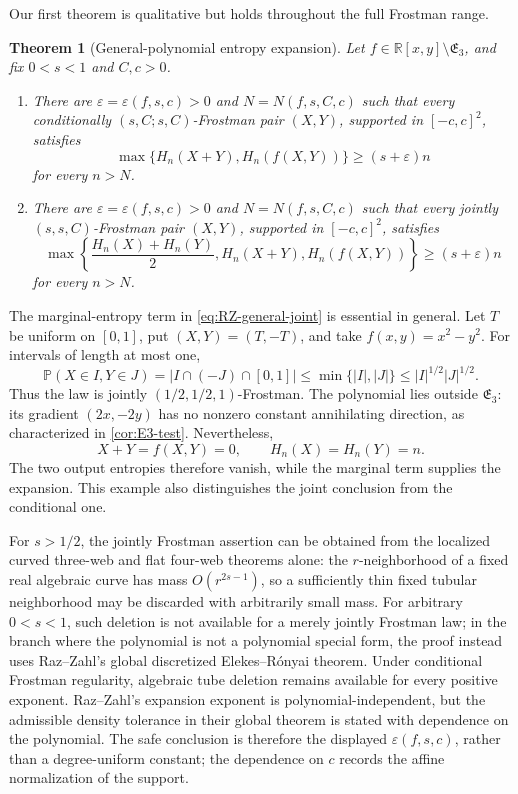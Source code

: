 \documentclass[11pt]{article}
\newtheorem{theorem}{Theorem}[section]
\begin{document}
Our first theorem is qualitative but holds throughout the full
Frostman range.

\begin{theorem}[General-polynomial entropy expansion]
\label{thm:RZ-general}
Let \(f\in\mathbb R[x,y]\setminus\mathfrak E_3\), and fix
\(0<s<1\) and \(C,c>0\).
\begin{enumerate}[label=\textup{(\roman*)}]
\item There are \(\varepsilon=\varepsilon(f,s,c)>0\) and
\(N=N(f,s,C,c)\) such that every conditionally
\((s,C;s,C)\)-Frostman pair \((X,Y)\), supported in
\([-c,c]^2\), satisfies
\begin{equation}
 \max\{H_n(X+Y),H_n(f(X,Y))\}\ge(s+\varepsilon)n
 \label{eq:RZ-general-cond}
\end{equation}
for every \(n>N\).

\item There are \(\varepsilon=\varepsilon(f,s,c)>0\) and
\(N=N(f,s,C,c)\) such that every jointly
\((s,s,C)\)-Frostman pair \((X,Y)\), supported in
\([-c,c]^2\), satisfies
\begin{equation}
 \max\left\{\frac{H_n(X)+H_n(Y)}{2},
 H_n(X+Y),H_n(f(X,Y))\right\}\ge(s+\varepsilon)n
 \label{eq:RZ-general-joint}
\end{equation}
for every \(n>N\).
\end{enumerate}
\end{theorem}

The marginal-entropy term in \eqref{eq:RZ-general-joint} is essential
in general.  Let \(T\) be uniform on \([0,1]\), put
\((X,Y)=(T,-T)\), and take \(f(x,y)=x^2-y^2\).  For intervals of
length at most one,
\[
 \mathbb P(X\in I,Y\in J)
 =|I\cap(-J)\cap[0,1]|
 \le\min\{|I|,|J|\}
 \le |I|^{1/2}|J|^{1/2}.
\]
Thus the law is jointly \((1/2,1/2,1)\)-Frostman.  The polynomial
lies outside \(\mathfrak E_3\): its gradient \((2x,-2y)\) has no
nonzero constant annihilating direction, as characterized in
\cref{cor:E3-test}.  Nevertheless,
\[
 X+Y=f(X,Y)=0,
 \qquad H_n(X)=H_n(Y)=n.
\]
The two output entropies therefore vanish, while the marginal term
supplies the expansion.  This example also distinguishes the joint
conclusion from the conditional one.

For \(s>1/2\), the jointly Frostman assertion can be obtained from
the localized curved three-web and flat four-web theorems alone:
the \(r\)-neighborhood of a fixed real algebraic curve has mass
\(O(r^{2s-1})\), so a sufficiently thin fixed tubular neighborhood
may be discarded with arbitrarily small mass.  For arbitrary
\(0<s<1\), such deletion is not available for a merely jointly
Frostman law; in the branch where the polynomial is not a polynomial
special form, the proof instead uses Raz--Zahl's global discretized
Elekes--R\'onyai theorem.  Under conditional Frostman regularity,
algebraic tube deletion remains available for every positive
exponent.  Raz--Zahl's expansion exponent is polynomial-independent,
but the admissible density tolerance in their global theorem is stated
with dependence on the polynomial.  The safe conclusion is therefore
the displayed \(\varepsilon(f,s,c)\), rather than a degree-uniform constant;
the dependence on \(c\) records the affine normalization of the support.
\end{document}
